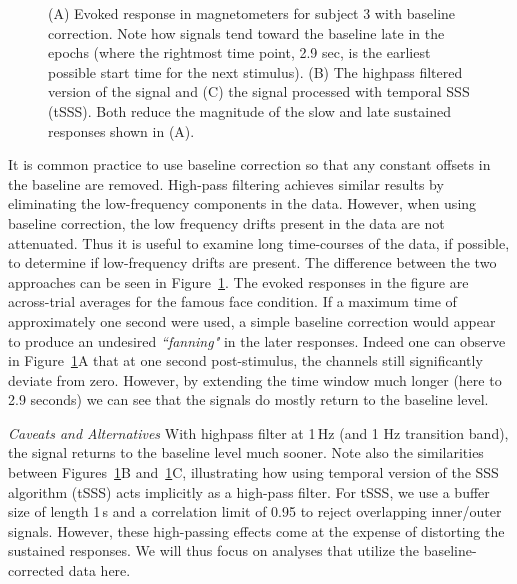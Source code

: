 \begin{figure}[t]
  \vspace{-10pt}
\caption[Comparison of highpass filtering and tSSS on evoked response.]{(A) Evoked response in magnetometers for subject 3 with baseline correction. Note how signals tend toward the baseline late in the epochs (where the rightmost time point, 2.9 sec, is the earliest possible start time for the next stimulus). (B) The highpass filtered version of the signal and (C) the signal processed with temporal SSS (tSSS). Both reduce the magnitude of the slow and late sustained responses shown in (A).}
\label{fig:fanning}
\end{figure}
  
It is common practice to use baseline correction so that any constant offsets in the baseline are removed. High-pass filtering achieves similar results by eliminating the low-frequency components in the data. However, when using baseline correction, the low frequency drifts present in the data are not attenuated. Thus it is useful to examine long time-courses of the data, if possible, to determine if low-frequency drifts are present. The difference between the two approaches can be seen in Figure~\ref{fig:fanning}. The evoked responses in the figure are across-trial averages for the famous face condition. If a maximum time of approximately one second were used, a simple baseline correction would appear to produce an undesired \textit{``fanning"} in the later responses. Indeed one can observe in Figure~\ref{fig:fanning}A that at one second post-stimulus, the channels still significantly deviate from zero. However, by extending the time window much longer (here to 2.9 seconds) we can see that the signals do mostly return to the baseline level.

\emph{Caveats and Alternatives} With highpass filter at 1\,Hz (and 1 Hz transition band), the signal returns to the baseline level much sooner. Note also the similarities between Figures~\ref{fig:fanning}B and~\ref{fig:fanning}C, illustrating how using temporal version of the SSS algorithm (tSSS) acts implicitly as a high-pass filter. For tSSS, we use a buffer size of length 1\,s and a correlation limit of 0.95 to reject overlapping inner/outer signals. However, these high-passing effects come at the expense of distorting the sustained responses. We will thus focus on analyses that utilize the baseline-corrected data here.

